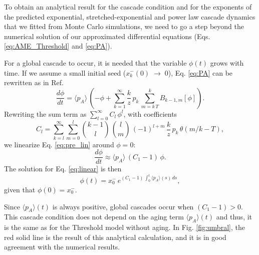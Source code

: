 To obtain an analytical result for the cascade condition and for the exponents of the predicted exponential, stretched-exponential and power law cascade dynamics that we fitted from Monte Carlo simulations, we need to go a step beyond the numerical solution of our approximated differential equations (Eqs. \eqref{eq:AME_Threshold} and \eqref{eq:PA}). 

For a global cascade to occur, it is needed that the variable $\phi(t)$ grows with time. If we assume a small initial seed ($x^{-}_{k} (0) \; \to \; 0$), Eq. \eqref{eq:PA} can be rewritten as in Ref. \cite{gleeson-2007}
\begin{equation} %
    \label{eq:pre_lin}
    \frac{d \phi}{dt}  = \langle p_A \rangle \, \left( -\phi + \sum_{k=1}^{\infty} \frac{k}{z} \, p_k \, \sum_{m = k\, T}^{k} B_{k-1,m} [\phi] \right).
\end{equation}
Rewriting the sum term as $\sum_{l=0}^{\infty} C_l \, \phi^l$, with coefficients 
\begin{equation}
    \label{eq:coef_phi}
    C_l = \sum_{k=l}^{\infty} \sum_{m=0}^{l} { k-1 \choose l} \, {l \choose m} \, (-1)^{l+m} \, \frac{k}{z} \, p_k \, \theta\left(m/k - T \right),
\end{equation}
we linearize Eq. \eqref{eq:pre_lin} around $\phi = 0$:
\begin{equation}
    \label{eq:linear}
    \frac{d \phi}{dt} \approx  \langle p_A \rangle \, ( C_1 -1) \, \phi.
\end{equation}
The solution for Eq. \eqref{eq:linear} is then
\begin{equation}
    \label{eq:phi_general}
    \phi(t) = x^{-}_{0}\,  e^{(C_1 - 1) \, \int_0^t \langle p_A \rangle (s) \, ds},
\end{equation}
given that $ \phi(0) = x^{-}_{0}$.

Since $\langle p_A \rangle(t)$ is always positive, global cascades occur when $( C_1 - 1) > 0 $. This cascade condition does not depend on the aging term $\langle p_A \rangle(t)$ and thus, it is the same as for the Threshold model without aging. In Fig. \ref{fig:umbral}, the red solid line is the result of this analytical calculation, and it is in good agreement with the numerical results. 


